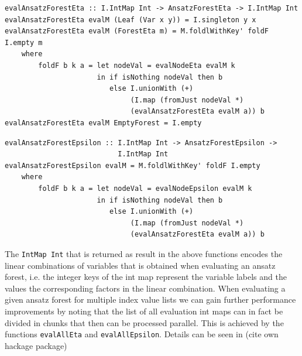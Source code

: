 \documentclass[a4paper,12pt, DIV=14, BCOR=5mm, twoside, headsepline]{scrbook}
\begin{document}
\begin{samepage}
\begin{verbatim}
evalAnsatzForestEta :: I.IntMap Int -> AnsatzForestEta -> I.IntMap Int
evalAnsatzForestEta evalM (Leaf (Var x y)) = I.singleton y x
evalAnsatzForestEta evalM (ForestEta m) = M.foldlWithKey' foldF I.empty m
    where
        foldF b k a = let nodeVal = evalNodeEta evalM k
                      in if isNothing nodeVal then b
                         else I.unionWith (+)
                              (I.map (fromJust nodeVal *)
                              (evalAnsatzForestEta evalM a)) b
evalAnsatzForestEta evalM EmptyForest = I.empty
\end{verbatim} 
\end{samepage}

\begin{samepage}
\begin{verbatim}
evalAnsatzForestEpsilon :: I.IntMap Int -> AnsatzForestEpsilon ->
                           I.IntMap Int
evalAnsatzForestEpsilon evalM = M.foldlWithKey' foldF I.empty
    where
        foldF b k a = let nodeVal = evalNodeEpsilon evalM k
                      in if isNothing nodeVal then b
                         else I.unionWith (+) 
                              (I.map (fromJust nodeVal *)
                              (evalAnsatzForestEta evalM a)) b  
\end{verbatim} 
\end{samepage}

The \texttt{IntMap Int} that is returned as result in the above functions encodes the linear combinations of variables that is obtained when evaluating an ansatz forest, i.e. the integer keys of the int map represent the variable labels and the values the corresponding factors in the linear combination. 
When evaluating a given ansatz forest for multiple index value lists we can gain further performance improvements by noting that the list of all evaluation int maps can in fact be divided in chunks that then can be processed parallel. This is achieved by the functions \texttt{evalAllEta} and \texttt{evalAllEpsilon}. Details can be seen in (cite own hackage package)
\end{document}
